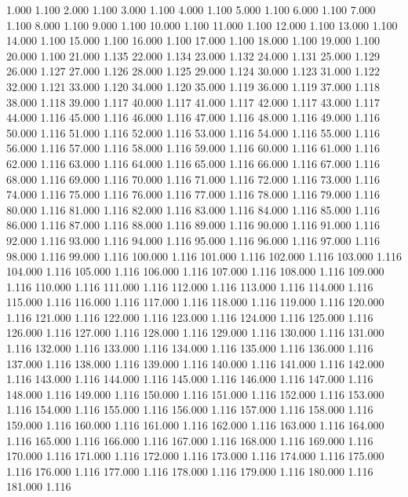 1.000 1.100 
2.000 1.100 
3.000 1.100 
4.000 1.100 
5.000 1.100 
6.000 1.100 
7.000 1.100 
8.000 1.100 
9.000 1.100 
10.000 1.100 
11.000 1.100 
12.000 1.100 
13.000 1.100 
14.000 1.100 
15.000 1.100 
16.000 1.100 
17.000 1.100 
18.000 1.100 
19.000 1.100 
20.000 1.100 
21.000 1.135 
22.000 1.134 
23.000 1.132 
24.000 1.131 
25.000 1.129 
26.000 1.127 
27.000 1.126 
28.000 1.125 
29.000 1.124 
30.000 1.123 
31.000 1.122 
32.000 1.121 
33.000 1.120 
34.000 1.120 
35.000 1.119 
36.000 1.119 
37.000 1.118 
38.000 1.118 
39.000 1.117 
40.000 1.117 
41.000 1.117 
42.000 1.117 
43.000 1.117 
44.000 1.116 
45.000 1.116 
46.000 1.116 
47.000 1.116 
48.000 1.116 
49.000 1.116 
50.000 1.116 
51.000 1.116 
52.000 1.116 
53.000 1.116 
54.000 1.116 
55.000 1.116 
56.000 1.116 
57.000 1.116 
58.000 1.116 
59.000 1.116 
60.000 1.116 
61.000 1.116 
62.000 1.116 
63.000 1.116 
64.000 1.116 
65.000 1.116 
66.000 1.116 
67.000 1.116 
68.000 1.116 
69.000 1.116 
70.000 1.116 
71.000 1.116 
72.000 1.116 
73.000 1.116 
74.000 1.116 
75.000 1.116 
76.000 1.116 
77.000 1.116 
78.000 1.116 
79.000 1.116 
80.000 1.116 
81.000 1.116 
82.000 1.116 
83.000 1.116 
84.000 1.116 
85.000 1.116 
86.000 1.116 
87.000 1.116 
88.000 1.116 
89.000 1.116 
90.000 1.116 
91.000 1.116 
92.000 1.116 
93.000 1.116 
94.000 1.116 
95.000 1.116 
96.000 1.116 
97.000 1.116 
98.000 1.116 
99.000 1.116 
100.000 1.116 
101.000 1.116 
102.000 1.116 
103.000 1.116 
104.000 1.116 
105.000 1.116 
106.000 1.116 
107.000 1.116 
108.000 1.116 
109.000 1.116 
110.000 1.116 
111.000 1.116 
112.000 1.116 
113.000 1.116 
114.000 1.116 
115.000 1.116 
116.000 1.116 
117.000 1.116 
118.000 1.116 
119.000 1.116 
120.000 1.116 
121.000 1.116 
122.000 1.116 
123.000 1.116 
124.000 1.116 
125.000 1.116 
126.000 1.116 
127.000 1.116 
128.000 1.116 
129.000 1.116 
130.000 1.116 
131.000 1.116 
132.000 1.116 
133.000 1.116 
134.000 1.116 
135.000 1.116 
136.000 1.116 
137.000 1.116 
138.000 1.116 
139.000 1.116 
140.000 1.116 
141.000 1.116 
142.000 1.116 
143.000 1.116 
144.000 1.116 
145.000 1.116 
146.000 1.116 
147.000 1.116 
148.000 1.116 
149.000 1.116 
150.000 1.116 
151.000 1.116 
152.000 1.116 
153.000 1.116 
154.000 1.116 
155.000 1.116 
156.000 1.116 
157.000 1.116 
158.000 1.116 
159.000 1.116 
160.000 1.116 
161.000 1.116 
162.000 1.116 
163.000 1.116 
164.000 1.116 
165.000 1.116 
166.000 1.116 
167.000 1.116 
168.000 1.116 
169.000 1.116 
170.000 1.116 
171.000 1.116 
172.000 1.116 
173.000 1.116 
174.000 1.116 
175.000 1.116 
176.000 1.116 
177.000 1.116 
178.000 1.116 
179.000 1.116 
180.000 1.116 
181.000 1.116 
